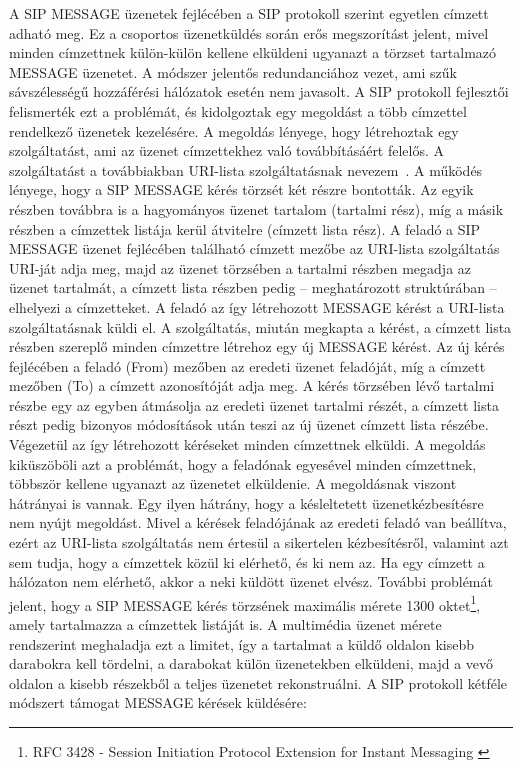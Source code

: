 A SIP MESSAGE üzenetek fejlécében a SIP protokoll szerint egyetlen címzett adható meg. Ez a csoportos üzenetküldés során erős megszorítást jelent, mivel minden címzettnek külön-külön kellene elküldeni ugyanazt a törzset tartalmazó MESSAGE üzenetet. A módszer jelentős redundanciához vezet, ami szűk sávszélességű hozzáférési hálózatok esetén nem javasolt. A SIP protokoll fejlesztői felismerték ezt a problémát, és kidolgoztak egy megoldást a több címzettel rendelkező üzenetek kezelésére.
A megoldás lényege, hogy létrehoztak egy szolgáltatást, ami az üzenet címzettekhez való továbbításáért felelős. A szolgáltatást a továbbiakban URI-lista szolgáltatásnak nevezem~\cite{rfc5365}. A működés lényege, hogy a SIP MESSAGE kérés törzsét két részre bontották. Az egyik részben továbbra is a hagyományos üzenet tartalom (tartalmi rész), míg a másik részben a címzettek listája kerül átvitelre (címzett lista rész). A feladó a SIP MESSAGE üzenet fejlécében található címzett mezőbe az URI-lista szolgáltatás URI-ját adja meg, majd az üzenet törzsében a tartalmi részben megadja az üzenet tartalmát, a címzett lista részben pedig -- meghatározott struktúrában --  elhelyezi a címzetteket. A feladó az így létrehozott MESSAGE kérést a URI-lista szolgáltatásnak küldi el. A szolgáltatás, miután megkapta a kérést, a címzett lista részben szereplő minden címzettre létrehoz egy új MESSAGE kérést. Az új kérés fejlécében a feladó (From) mezőben az eredeti üzenet feladóját, míg a címzett mezőben (To) a címzett azonosítóját adja meg. A kérés törzsében lévő tartalmi részbe egy az egyben átmásolja az eredeti üzenet tartalmi részét, a címzett lista részt pedig bizonyos módosítások után teszi az új üzenet címzett lista részébe. Végezetül az így létrehozott kéréseket minden címzettnek elküldi. A megoldás kiküszöböli azt a problémát, hogy a feladónak egyesével minden címzettnek, többször kellene ugyanazt az üzenetet elküldenie. A megoldásnak viszont hátrányai is vannak. Egy ilyen hátrány, hogy a késleltetett üzenetkézbesítésre nem nyújt megoldást. Mivel a kérések feladójának az eredeti feladó van beállítva, ezért az URI-lista szolgáltatás nem értesül a sikertelen kézbesítésről, valamint azt sem tudja, hogy a címzettek közül ki elérhető, és ki nem az. Ha egy címzett a hálózaton nem elérhető, akkor a neki küldött üzenet elvész. További problémát jelent, hogy a SIP MESSAGE kérés törzsének maximális mérete 1300 oktet\footnote{RFC 3428 - Session Initiation Protocol Extension for Instant Messaging \cite{rfc3428}}, amely tartalmazza a címzettek listáját is. A multimédia üzenet mérete rendszerint meghaladja ezt a limitet, így a tartalmat a küldő oldalon kisebb darabokra kell tördelni, a darabokat külön üzenetekben elküldeni, majd a vevő oldalon a kisebb részekből a teljes üzenetet rekonstruálni. A SIP protokoll kétféle módszert támogat MESSAGE kérések küldésére:

